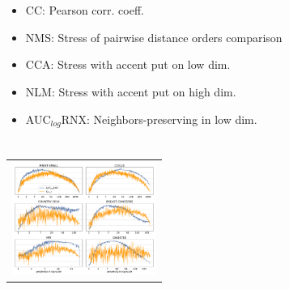 \documentclass[portrait,final,a0paper]{nadiposter}
\newcommand{\compresslist}{%
\setlength{\itemsep}{1pt}%
\setlength{\parskip}{0pt}%
\setlength{\parsep}{0pt}%
\setlength{\leftmargin}{0pt}%
}
\begin{document}
\begin{poster}
{\begin{multicols}{2}
    \section*{}
    \begin{itemize}
        \compresslist
        \item CC: Pearson corr. coeff.
        \item NMS: Stress of pairwise distance orders comparison
        \item CCA: Stress with accent put on low dim.
        \item NLM: Stress with accent put on high dim.
        \item AUC$_{log}$RNX: Neighbors-preserving in low dim.
    \end{itemize}
        
    \section*{}
    \begin{center}
    \begin{tabular}{c}
        \includegraphics[height=10em]{poster_NADI_2018/images/sall_auc_50.pdf}
    \end{tabular}
    \end{center}
\end{multicols}

}




\end{poster}
\end{document}

